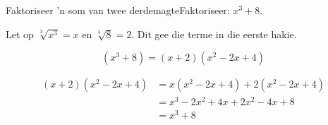 \begin{wex}{Faktoriseer 'n som van twee derdemagte}{Faktoriseer: $x^{3}+8$.}
{
Let op $\sqrt[3]{x^{3}} = x$ en $\sqrt[3]{8} = 2$. Dit gee die terme in die eerste hakie.

\begin{equation*}
  (x^{3} +8) = (x+2)(x^{2}-2x+4)
\end{equation*}

\begin{align*}
  (x+2)(x^{2}-2x+4) &= x(x^{2}-2x+4)+2(x^{2}-2x+4)\\
		   &=x^{3}-2x^{2}+4x+2x^{2}-4x+8\\
		   &=x^{3}+8\\
\end{align*}
\vspace*{-50pt}}
\end{wex}

